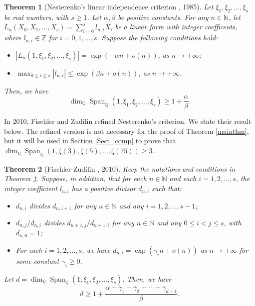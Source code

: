 \documentclass[12pt]{article}
\newtheorem{theorem}{Theorem}[section]
\numberwithin{equation}{section}
\begin{document}
\begin{theorem}[Nesterenko's linear independence criterion \cite{Nes1985}, 1985]\label{Nes}
Let $\xi_1,\xi_2,\ldots,\xi_s$ be real numbers, with $s \geqslant 1$. Let $\alpha, \beta$ be positive constants. For any $n \in \mathbb{N}$, let $L_n(X_0,X_1,\ldots,X_s) = \sum_{i=0}^{s} l_{n,i}X_i$ be a linear form with integer coefficents, where $l_{n,i} \in \mathbb{Z}$ for $i=0,1,\ldots,s$. Suppose the following conditions hold:
\begin{itemize}
	\item $|L_n(1,\xi_1,\xi_2,\ldots,\xi_s)| = \exp\left( -\alpha n + o(n)  \right)$, as $n \to +\infty$;
	\item $\max_{0\leqslant i \leqslant s} |l_{n,i}| \leqslant \exp\left( \beta n + o(n) \right)$, as $n \to +\infty$.
\end{itemize}
Then, we have 
\[ \dim_{\mathbb{Q}}\operatorname{Span}_{\mathbb{Q}}\left( 1,\xi_1,\xi_2,\ldots,\xi_s \right) \geqslant 1 +\frac{\alpha}{\beta}. \]
\end{theorem}

\bigskip

In 2010, Fischler and Zudilin \cite{FZ2010} refined Nesterenko's criterion. We state their result below. The refined version is not necessary for the proof of Theorem \ref{mainthm}, but it will be used in Section \ref{Sect_comp} to prove that $\dim_{\mathbb{Q}}\operatorname{Span}_{\mathbb{Q}}\left( 1,\zeta(3),\zeta(5),\ldots,\zeta(75) \right) \geqslant 3$. 

\begin{theorem}[Fischler-Zudilin \cite{FZ2010}, 2010]\label{reNes}
Keep the notations and conditions in Theorem \ref{Nes}. Suppose, in addition, that for each $n \in \mathbb{N}$ and each $i=1,2,\ldots,s$, the integer coefficient $l_{n,i}$ has a positive divisor $d_{n,i}$ such that:
\begin{itemize}
	\item $d_{n,i}$ divides $d_{n,i+1}$ for any $n \in \mathbb{N}$ and any $i=1,2,\ldots,s-1$;
	\item $d_{n,j}/d_{n,i}$ divides $d_{n+1,j}/d_{n+1,i}$ for any $n \in \mathbb{N}$ and any $0 \leqslant i < j \leqslant s$, with $d_{n,0}=1$;
	\item For each $i=1,2,\ldots,s$, we have $d_{n,i}= \exp\left( \gamma_i n + o(n) \right)$ as $n \to +\infty$ for some constant $\gamma_i \geqslant 0$.
\end{itemize}
Let $d = \dim_{\mathbb{Q}}\operatorname{Span}_{\mathbb{Q}}\left( 1,\xi_1,\xi_2,\ldots,\xi_s \right)$. Then, we have
\[ d \geqslant 1 + \frac{\alpha + \gamma_1 + \gamma_2 + \cdots + \gamma_{d-1}} {\beta}. \]
\end{theorem}
\end{document}

